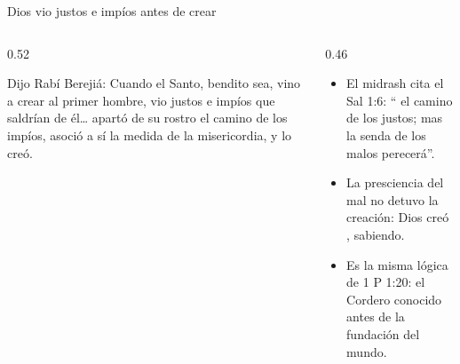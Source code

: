 \begin{frame}{Dios vio justos e impíos antes de crear}
\begin{columns}[t,onlytextwidth]
\begin{column}{0.52\textwidth}
\begin{cita}Dijo Rabí Berejiá: Cuando el Santo, bendito sea, vino a crear al primer hombre, vio justos e impíos que saldrían de él\ldots{} apartó de su rostro el camino de los impíos, asoció a sí la medida de la misericordia, y lo creó.\end{cita}
\begin{center}\end{center}
\end{column}
\begin{column}{0.46\textwidth}\small
\begin{itemize}
\item El midrash cita el Sal 1:6: ``\SENOR{}  el camino de los justos; mas la senda de los malos perecerá''.
\item La presciencia del mal no detuvo la creación: Dios creó , sabiendo.
\item Es la misma lógica de 1 P 1:20: el Cordero conocido antes de la fundación del mundo.
\end{itemize}
\end{column}
\end{columns}
\end{frame}

